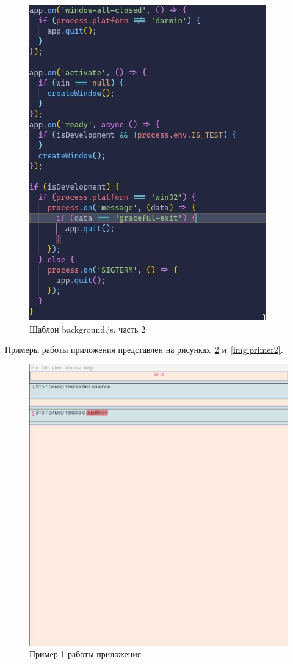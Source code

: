 \begin{figure}[H]
  \centering
  \includegraphics[height=0.4\textheight]{TexModules/pics/backPT2.jpg}
  \caption{Шаблон background.js, часть 2}
  \label{img:backPT2}
\end{figure}

Примеры работы приложения представлен на рисунках~\ref{img:primer1} и~\ref{img:primer2}.

\begin{figure}[H]
  \centering
  \includegraphics[height=0.4\textheight]{TexModules/pics/primer1.jpg}
  \caption{Пример 1 работы приложения}
  \label{img:primer1}
\end{figure}

